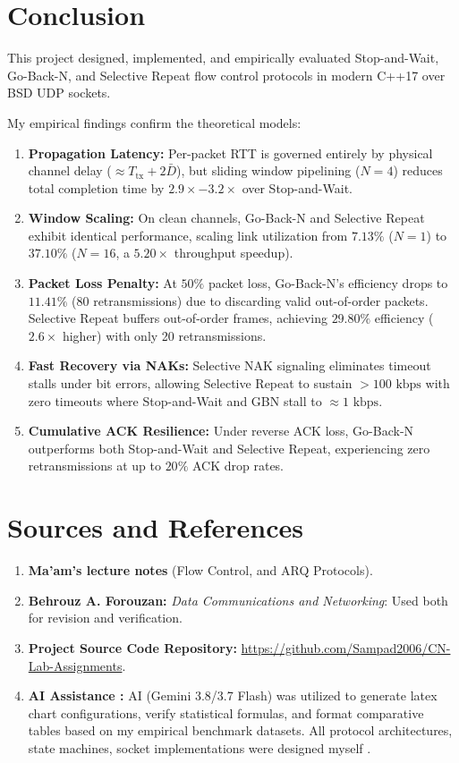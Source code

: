 \documentclass[11pt,a4paper]{article}
\begin{document}
\FloatBarrier
\section{Conclusion}

This project designed, implemented, and empirically evaluated Stop-and-Wait, Go-Back-N, and Selective Repeat flow control protocols in modern C++17 over BSD UDP sockets.

My empirical findings confirm the theoretical models:
\begin{enumerate}
    \item \textbf{Propagation Latency:} Per-packet RTT is governed entirely by physical channel delay ($\approx T_{\text{tx}} + 2\bar{D}$), but sliding window pipelining ($N=4$) reduces total completion time by $2.9\times - 3.2\times$ over Stop-and-Wait.
    \item \textbf{Window Scaling:} On clean channels, Go-Back-N and Selective Repeat exhibit identical performance, scaling link utilization from $7.13\%$ ($N=1$) to $37.10\%$ ($N=16$, a $5.20\times$ throughput speedup).
    \item \textbf{Packet Loss Penalty:} At $50\%$ packet loss, Go-Back-N's efficiency drops to $11.41\%$ (80 retransmissions) due to discarding valid out-of-order packets. Selective Repeat buffers out-of-order frames, achieving $29.80\%$ efficiency ($2.6\times$ higher) with only 20 retransmissions.
    \item \textbf{Fast Recovery via NAKs:} Selective NAK signaling eliminates timeout stalls under bit errors, allowing Selective Repeat to sustain $>100\text{ kbps}$ with zero timeouts where Stop-and-Wait and GBN stall to $\approx 1\text{ kbps}$.
    \item \textbf{Cumulative ACK Resilience:} Under reverse ACK loss, Go-Back-N outperforms both Stop-and-Wait and Selective Repeat, experiencing zero retransmissions at up to $20\%$ ACK drop rates.
\end{enumerate}

\FloatBarrier
\section{Sources and References}
\begin{enumerate}
    \item \textbf{Ma'am's lecture notes }(Flow Control, and ARQ Protocols).
    \item \textbf{Behrouz A. Forouzan:} \textit{Data Communications and Networking}: Used both for revision and verification.
    \item \textbf{Project Source Code Repository:} \url{https://github.com/Sampad2006/CN-Lab-Assignments}.
    \item \textbf{AI Assistance :} AI (Gemini 3.8/3.7 Flash) was utilized to generate latex chart configurations, verify statistical formulas, and format comparative tables based on my empirical benchmark datasets. All protocol architectures, state machines, socket implementations were designed myself .
\end{enumerate}
\end{document}

